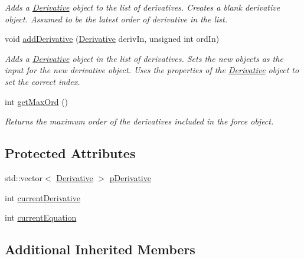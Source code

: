 \begin{DoxyCompactItemize}
\begin{DoxyCompactList}\small\item\em Adds a \hyperlink{classosea_1_1ofreq_1_1_derivative}{Derivative} object to the list of derivatives. Creates a blank derivative object. Assumed to be the latest order of derivative in the list. \end{DoxyCompactList}\item 
void \hyperlink{classosea_1_1ofreq_1_1_force_react_a7f860f5726f2f9f9baba9775dc72f1ff}{add\-Derivative} (\hyperlink{classosea_1_1ofreq_1_1_derivative}{Derivative} deriv\-In, unsigned int ord\-In)
\begin{DoxyCompactList}\small\item\em Adds a \hyperlink{classosea_1_1ofreq_1_1_derivative}{Derivative} object in the list of derivatives. Sets the new objects as the input for the new derivative object. Uses the properties of the \hyperlink{classosea_1_1ofreq_1_1_derivative}{Derivative} object to set the correct index. \end{DoxyCompactList}\item 
int \hyperlink{classosea_1_1ofreq_1_1_force_react_ae11cdc98d818ca97f710ed13e584c53f}{get\-Max\-Ord} ()
\begin{DoxyCompactList}\small\item\em Returns the maximum order of the derivatives included in the force object. \end{DoxyCompactList}\end{DoxyCompactItemize}
\subsection*{Protected Attributes}
\begin{DoxyCompactItemize}
\item 
std\-::vector$<$ \hyperlink{classosea_1_1ofreq_1_1_derivative}{Derivative} $>$ \hyperlink{classosea_1_1ofreq_1_1_force_react_a28d2bfdc97809181be4d21713cc52181}{p\-Derivative}
\item 
int \hyperlink{classosea_1_1ofreq_1_1_force_react_a56c47ef95ad9ac1876b832dbf75297dd}{current\-Derivative}
\item 
int \hyperlink{classosea_1_1ofreq_1_1_force_react_a35b2a5464dd0135961e04a8389f5967f}{current\-Equation}
\end{DoxyCompactItemize}
\subsection*{Additional Inherited Members}


